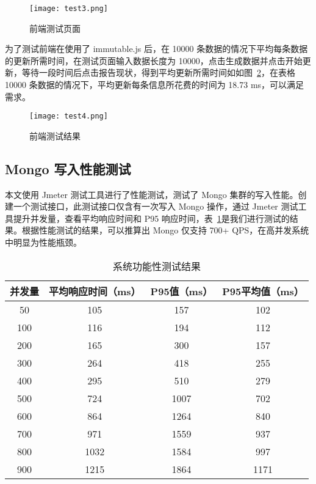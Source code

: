\begin{figure}[!htp]
    \centering
    \texttt{[image: test3.png]}
    \caption{前端测试页面}
    \label{fig:test3}
  \end{figure}

  为了测试前端在使用了 immutable.js 后，在 10000 条数据的情况下平均每条数据的更新所需时间，在测试页面输入数据长度为 10000，点击生成数据并点击开始更新，等待一段时间后点击报告现状，得到平均更新所需时间如如图~\ref{fig:test4}，在表格 10000 条数据的情况下，平均更新每条信息所花费的时间为 18.73 ms，可以满足需求。

  \begin{figure}[!htp]
    \centering
    \texttt{[image: test4.png]}
    \caption{前端测试结果}
    \label{fig:test4}
  \end{figure}

  \subsection{Mongo 写入性能测试}
  本文使用 Jmeter 测试工具进行了性能测试，测试了 Mongo 集群的写入性能。创建一个测试接口，此测试接口仅含有一次写入 Mongo 操作，通过 Jmeter 测试工具提升并发量，查看平均响应时间和 P95 响应时间，表~\ref{fig:test5}是我们进行测试的结果。根据性能测试的结果，可以推算出 Mongo 仅支持 700+ QPS，在高并发系统中明显为性能瓶颈。
  \begin{table}[h!]
    \begin{center}
      \caption{系统功能性测试结果}
      \label{fig:test5}
      \begin{tabular}{ c c c c }
        \hline
        \textbf{并发量} & \textbf{平均响应时间（ms）
        } & \textbf{P95值（ms）
        } & \textbf{P95平均值（ms）
        } \\
        \hline
        50 & 105 & 157 & 102 \\
        100 & 116 & 194 & 112 \\
        200 & 165 & 300 & 157 \\
        300 & 264 & 418 & 255 \\
        400 & 295 & 510 & 279 \\
        500 & 724 & 1007 & 702 \\
        600 & 864 & 1264 & 840 \\
        700 & 971 & 1559 & 937 \\
        800 & 1032 & 1584 & 997 \\
        900 & 1215 & 1864 & 1171 \\
        \hline
      \end{tabular}
    \end{center}
  \end{table}

